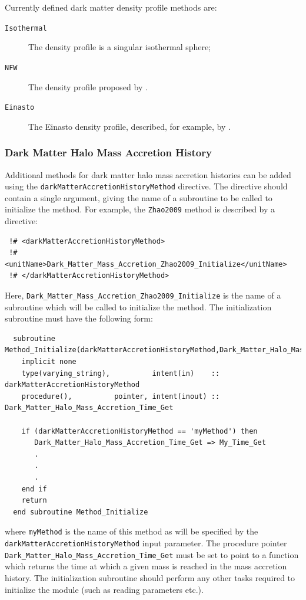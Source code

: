 Currently defined dark matter density profile methods are:
\begin{description}
 \item [{\tt Isothermal}] The density profile is a singular isothermal sphere;
 \item [{\tt NFW}] The density profile proposed by \cite{navarro_universal_1997}.
 \item [{\tt Einasto}] The Einasto density profile, described, for example, by \cite{cardone_spherical_2005}.
\end{description}

\subsubsection{Dark Matter Halo Mass Accretion History}\label{sec:HaloMassAccretionHistory}

Additional methods for dark matter halo mass accretion histories can be added using the {\tt darkMatterAccretionHistoryMethod} directive. The directive should contain a single argument, giving the name of a subroutine to be called to initialize the method. For example, the {\tt Zhao2009} method is described by a directive:
\begin{verbatim}
 !# <darkMatterAccretionHistoryMethod>
 !#  <unitName>Dark_Matter_Mass_Accretion_Zhao2009_Initialize</unitName>
 !# </darkMatterAccretionHistoryMethod>
\end{verbatim}
Here, {\tt Dark\_Matter\_Mass\_Accretion\_Zhao2009\_Initialize} is the name of a subroutine which will be called to initialize the method. The initialization subroutine must have the following form:
\begin{verbatim}
  subroutine Method_Initialize(darkMatterAccretionHistoryMethod,Dark_Matter_Halo_Mass_Accretion_Time_Get)
    implicit none
    type(varying_string),          intent(in)    :: darkMatterAccretionHistoryMethod
    procedure(),          pointer, intent(inout) :: Dark_Matter_Halo_Mass_Accretion_Time_Get
    
    if (darkMatterAccretionHistoryMethod == 'myMethod') then
       Dark_Matter_Halo_Mass_Accretion_Time_Get => My_Time_Get
       .
       .
       .
    end if
    return
  end subroutine Method_Initialize
\end{verbatim}
where {\tt myMethod} is the name of this method as will be specified by the {\tt darkMatterAccretionHistoryMethod} input parameter. The procedure pointer {\tt Dark\_Matter\_Halo\_Mass\_Accretion\_Time\_Get} must be set to point to a function which returns the time at which a given mass is reached in the mass accretion history. The initialization subroutine should perform any other tasks required to initialize the module (such as reading parameters etc.).


